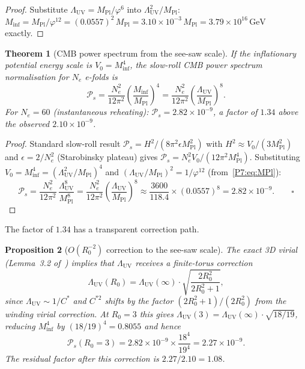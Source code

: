 \documentclass[11pt,a4paper]{article}
\newtheorem{theorem}{Theorem}[section]
\newtheorem{proposition}[theorem]{Proposition}
\theoremstyle{definition}
\theoremstyle{remark}
\newcommand{\vp}{\varphi}
\newcommand{\MPl}{M_{\mathrm{Pl}}}
\newcommand{\LUV}{\Lambda_{\mathrm{UV}}}
\begin{document}
\begin{proof}
Substitute $\LUV = \MPl/\vp^6$ into $\LUV^2/\MPl$:
$M_{\mathrm{inf}} = \MPl/\vp^{12} = (0.0557)^2\,\MPl = 3.10\times10^{-3}\,\MPl
= 3.79\times10^{16}\,\mathrm{GeV}$ exactly.
\end{proof}

\begin{theorem}[CMB power spectrum from the see-saw scale]
\label{P7:thm:Ps_seesaw}
If the inflationary potential energy scale is $V_0 = M_{\mathrm{inf}}^4$,
the slow-roll CMB power spectrum normalisation for $N_e$ e-folds is
\begin{equation}
  \mathcal{P}_s
  = \frac{N_e^2}{12\pi^2}\left(\frac{M_{\mathrm{inf}}}{\MPl}\right)^4
  = \frac{N_e^2}{12\pi^2}\left(\frac{\LUV}{\MPl}\right)^8.
  \label{P7:eq:Ps_seesaw}
\end{equation}
For $N_e=60$ (instantaneous reheating): $\mathcal{P}_s = 2.82\times10^{-9}$,
a factor of $1.34$ above the observed $2.10\times10^{-9}$.
\end{theorem}

\begin{proof}
Standard slow-roll result $\mathcal{P}_s = H^2/(8\pi^2\epsilon\MPl^2)$
with $H^2\approx V_0/(3\MPl^2)$ and $\epsilon = 2/N_e^2$ (Starobinsky
plateau) gives $\mathcal{P}_s = N_e^2 V_0/(12\pi^2\MPl^4)$.
Substituting $V_0 = M_{\mathrm{inf}}^4 = (\LUV^2/\MPl)^4$ and
$(\LUV/\MPl)^2 = 1/\vp^{12}$ (from~\eqref{P7:eq:MPl}):
\[
  \mathcal{P}_s
  = \frac{N_e^2}{12\pi^2}\,\frac{\LUV^8}{\MPl^8}
  = \frac{N_e^2}{12\pi^2}\!\left(\frac{\LUV}{\MPl}\right)^{\!8}
  \approx \frac{3600}{118.4}\times(0.0557)^8
  = 2.82\times10^{-9}.  \qquad\square
\]
\end{proof}

The factor of $1.34$ has a transparent correction path.

\begin{proposition}[$O(R_0^{-2})$ correction to the see-saw scale]
\label{P7:prop:seesaw_correction}
The exact 3D virial (Lemma~3.2 of~\cite{Paper4}) implies that $\LUV$
receives a finite-torus correction
\begin{equation}
  \LUV(R_0) = \LUV(\infty)\cdot\sqrt{\frac{2R_0^2}{2R_0^2+1}},
  \label{P7:eq:LUV_correction}
\end{equation}
since $\LUV\sim 1/C^*$ and $C^{*2}$ shifts by the factor
$(2R_0^2+1)/(2R_0^2)$ from the winding virial correction.
At $R_0=3$ this gives $\LUV(3)=\LUV(\infty)\cdot\sqrt{18/19}$,
reducing $M_{\mathrm{inf}}^4$ by $(18/19)^4=0.8055$ and hence
\begin{equation}
  \mathcal{P}_s(R_0=3) = 2.82\times10^{-9}\times\frac{18^4}{19^4}
  = 2.27\times10^{-9}.
  \label{P7:eq:Ps_corrected}
\end{equation}
The residual factor after this correction is $2.27/2.10 = 1.08$.
\end{proposition}
\end{document}
